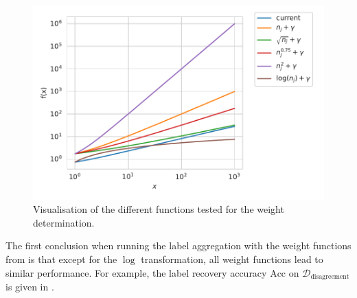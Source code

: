 \begin{table}[htbp]
    \caption{Weight functions tested, the associated confidence threshold $\theta_\mathrm{conf}$ and the accuracy performance on $\mathcal{D}_\text{disagreement}$.}
    \label{tab:weight_functions}
    \centering
\end{table}

\begin{figure}[htb]
    \centering
    \includegraphics[width=.7\textwidth]{./images_plantnet/weight_functions.pdf}
    \caption{Visualisation of the different functions tested for the weight determination.}
    \label{fig:weight_functions}
\end{figure}

The first conclusion when running the label aggregation with the weight functions from  is that except for the $\log$ transformation, all weight functions lead to similar performance.
For example, the label recovery accuracy $\mathrm{Acc}$ on $\mathcal{D}_\text{disagreement}$ is given in .


